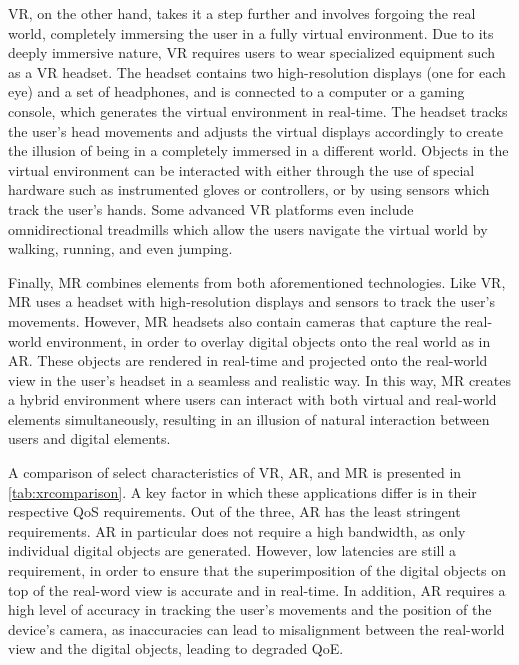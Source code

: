 \gls{VR}, on the other hand, takes it a step further and involves forgoing the real world, completely immersing the user in a fully virtual environment.
Due to its deeply immersive nature, \gls{VR} requires users to wear specialized equipment such as a \gls{VR} headset.
The headset contains two high-resolution displays (one for each eye) and a set of headphones, and is connected to a computer or a gaming console, which generates the virtual environment in real-time.
The headset tracks the user's head movements and adjusts the virtual displays accordingly to create the illusion of being in a completely immersed in a different world.
Objects in the virtual environment can be interacted with either through the use of special hardware such as instrumented gloves or controllers, or by using sensors which track the user's hands.
Some advanced \gls{VR} platforms even include omnidirectional treadmills which allow the users navigate the virtual world by walking, running, and even jumping. 

Finally, \gls{MR} combines elements from both aforementioned technologies.
Like \gls{VR}, \gls{MR} uses a headset with high-resolution displays and sensors to track the user's movements.
However, \gls{MR} headsets also contain cameras that capture the real-world environment, in order to overlay digital objects onto the real world as in \gls{AR}.
These objects are rendered in real-time and projected onto the real-world view in the user's headset in a seamless and realistic way.
In this way, \gls{MR} creates a hybrid environment where users can interact with both virtual and real-world elements simultaneously, resulting in an illusion of natural interaction between users and digital elements.



A comparison of select characteristics of \gls{VR}, \gls{AR}, and \gls{MR} is presented in \cref{tab:xrcomparison}.
A key factor in which these applications differ is in their respective \gls{QoS} requirements.
Out of the three, \gls{AR} has the least stringent requirements.
\gls{AR} in particular does not require a high bandwidth, as only individual digital objects are generated.
However, low latencies are still a requirement, in order to ensure that the superimposition of the digital objects on top of the real-word view is accurate and in real-time.
In addition, \gls{AR} requires a high level of accuracy in tracking the user's movements and the position of the device's camera, as inaccuracies can lead to misalignment between the real-world view and the digital objects, leading to degraded \gls{QoE}.

